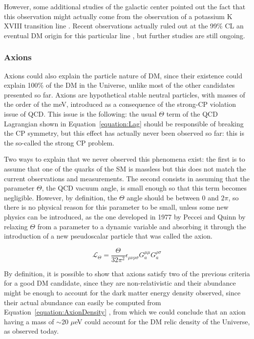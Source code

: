 \documentclass[a4paper, 10pt, openright]{report}
\begin{document}
However, some additional studies of the galactic center pointed out the fact that this observation might actually come from the observation of a potassium K XVIII transition line \cite{NoDetection}. Recent observations actually ruled out at the 99\% \ac{CL} an eventual \ac{DM} origin for this particular line \cite{Nope}, but further studies are still ongoing.

\subsubsection*{Axions}
Axions could also explain the particle nature of \ac{DM}, since their existence could explain 100\% of the \ac{DM} in the Universe, unlike most of the other candidates presented so far. Axions are hypothetical stable neutral particles, with masses of the order of the meV, introduced as a consequence of the strong-CP violation issue of \ac{QCD}. This issue is the following: the usual $\Theta$ term of the \ac{QCD} Lagrangian shown in Equation~\ref{equation:Lag} \cite{QCDLag} should be responsible of breaking the CP symmetry, but this effect has actually never been observed so far: this is the so-called the strong CP problem. 

Two ways to explain that we never observed this phenomena exist: the first is to assume that one of the quarks of the \ac{SM} is massless but this does not match the current observations and measurements. The second consists in assuming that the parameter $\Theta$, the \ac{QCD} vacuum angle, is small enough so that this term becomes negligible. However, by definition, the $\Theta$ angle should be between 0 and $2\pi$, so there is no physical reason for this parameter to be small, unless some new physics can be introduced, as the one developed in 1977 by Peccei and Quinn \cite{Peccei} by relaxing $\Theta$ from a parameter to  a dynamic variable and absorbing it through the introduction of a new pseudoscalar particle that was called the axion.

\begin{equation}
\label{equation:Lag}
\mathcal{L}_\Theta = \frac{\Theta}{32 \pi^2} \epsilon_{\mu \nu \rho \sigma} G_a^{\mu \mu} G_a^{\rho \sigma}
\end{equation}

By definition, it is possible to show that axions satisfy two of the previous criteria for a good \ac{DM} candidate, since they are non-relativistic and their abundance might be enough to account for the dark matter energy density observed, since their actual abundance can easily be computed from Equation~\ref{equation:AxionDensity} \cite{AxionSearches}, from which we could conclude that an axion having a mass of $\sim$20 $\mu$eV could account for the \ac{DM} relic density of the Universe, as observed today. 
\end{document}
